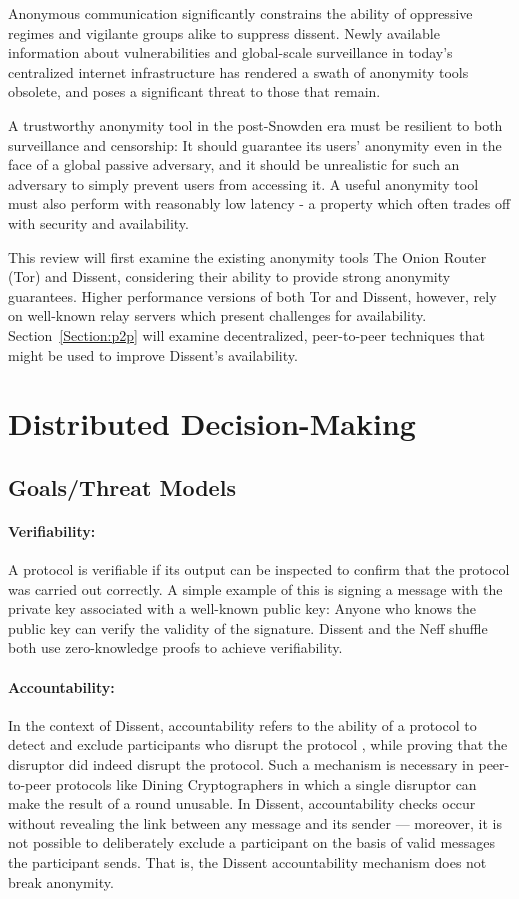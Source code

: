 Anonymous communication significantly constrains the ability of oppressive
regimes and vigilante groups alike to suppress dissent. Newly available
information about vulnerabilities and global-scale surveillance in today's
centralized internet infrastructure has rendered a swath of anonymity tools
obsolete, and poses a significant threat to those that remain.

A trustworthy anonymity tool in the post-Snowden era must be resilient to both
surveillance and censorship: It should guarantee its users' anonymity even in
the face of a global passive adversary, and it should be unrealistic for such an
adversary to simply prevent users from accessing it. A useful anonymity tool
must also perform with reasonably low latency - a property which often trades
off with security and availability.

This review will first examine the existing anonymity tools The Onion Router
(Tor) and Dissent, considering their ability to provide strong anonymity
guarantees. Higher performance versions of both Tor and Dissent, however, rely
on well-known relay servers which present challenges for availability.
Section~\ref{Section:p2p} will examine decentralized, peer-to-peer techniques
that might be used to improve Dissent's availability.
\section{Distributed Decision-Making}
  \subsection{Goals/Threat Models}
    \paragraph{Verifiability:} A protocol is verifiable if its output can be
    inspected to confirm that the protocol was carried out correctly. A simple
    example of this is signing a message with the private key associated with a
    well-known public key: Anyone who knows the public key can verify the
    validity of the signature. Dissent \cite{corrigan-gibbs_proactively_2013}
    and the Neff shuffle \cite{neff_verifiable_2001} both use zero-knowledge
    proofs to achieve verifiability.
    \paragraph{Accountability:} In the context of Dissent, accountability refers
    to the ability of a protocol to detect and exclude participants who disrupt
    the protocol \cite{syta_security_2014}, while proving that the disruptor did
    indeed disrupt the protocol. Such a mechanism is necessary in peer-to-peer
    protocols like Dining Cryptographers in which a single disruptor can make
    the result of a round unusable. In Dissent, accountability checks occur
    without revealing the link between any message and its sender --- moreover,
    it is not possible to deliberately exclude a participant on the basis of
    valid messages the participant sends. That is, the Dissent accountability
    mechanism does not break anonymity.
